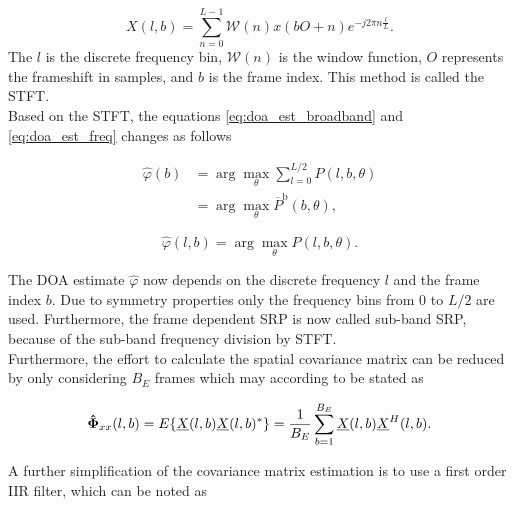 \begin{equation}
X(l,b) = \sum_{n=0}^{L-1}\mathcal{W}(n)x(bO+n)e^{-j2\pi n\frac{l}{L}}.
\end{equation}
The $l$ is the discrete frequency bin, $\mathcal{W}(n)$ is the window function, $O$ represents the frameshift in samples, and $b$ is the frame index. This method is called the \ac{STFT}. \cite[Chapter~2.5.4]{loizou2013speech} \\
Based on the \ac{STFT}, the equations \ref{eq:doa_est_broadband} and \ref{eq:doa_est_freq} changes as follows

\begin{equation}
\begin{split}
\hat{\varphi}(b) &= \arg \max_{\theta}\sum^{L/2}_{l=0}P(l,b,\theta)\\
&= \arg \max_{\theta}\overline P^\text{b}(b,\theta),
\end{split}
\label{eq:doa_est_broadband_stft}
\end{equation}

\begin{equation}
\hat{\varphi}(l,b) = \arg \max_{\theta}P(l,b,\theta).
\label{eq:doa_est_freq_stft}
\end{equation}

The \ac{DOA} estimate $\hat \varphi$ now depends on the discrete frequency $l$ and the frame index $b$. Due to symmetry properties only the frequency bins from 0 to $L/2$ are used.
Furthermore, the frame dependent \ac{SRP} is now called sub-band SRP, because of the sub-band frequency division by \ac{STFT}.\\
Furthermore, the effort to calculate the spatial covariance matrix can be reduced by only considering $B_E$ frames which may according to \cite{krim1996two}
be stated as


\begin{equation}
\mathbf{ \hat{\Phi}}_{xx}(l,b) = E\{\underline{X}(l,b)\underline{X}(l,b)^*\} = \frac{1}{B_E}\sum^{B_E}_{b=1} \underline{X}(l,b)\underline{X}^H(l,b).
\end{equation}


A further simplification of the covariance matrix estimation is to use a first order \ac{IIR} filter, which can be noted as \\

